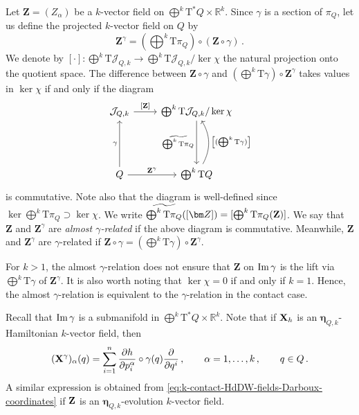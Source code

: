 \documentclass[11pt,twoside]{article}
\theoremstyle{plain}
\theoremstyle{definition}
\theoremstyle{remark}
\newcommand{\T}{\mathrm{T}}
\newcommand{\cT}{\mathrm{T}^\ast}
\begin{document}
Let $\mathbf{Z}=(Z_\alpha)$ be a $k$-vector field on
$\bigoplus^k \cT Q \times \mathbb{R}^k$. Since $\gamma$ is a section of $\pi_Q$, let us define the projected $k$-vector
field on $Q$ by
\[
\textstyle\mathbf{Z}^\gamma
=\left(\bigoplus\nolimits^k \T\pi_Q\right)\circ (\mathbf{Z}\circ \gamma)\,.
\]
We denote by $\left[\cdot\right]\colon\bigoplus^k\T\mathcal{J}_{Q,k}\to \bigoplus^k\T\mathcal{J}_{Q,k}/\ker \chi$ the natural projection onto the quotient space. 
The difference between \(
\mathbf{Z}\circ \gamma\) and \(
\left(\bigoplus\nolimits^k \T\gamma\right)\circ \mathbf{Z}^\gamma
\) takes values in $\ker \chi$ if and only if the diagram
\[
\begin{tikzcd}[row sep=4.5em]
\mathcal{J}_{Q,k}
  \arrow[r,"{[\mathbf{Z}]}"]
&
\bigoplus^k \T\mathcal{J}_{Q,k}/\ker \chi
  \arrow[d,"\widetilde{\bigoplus^k \T\pi_Q}"']
\\
Q
  \arrow[r,"\mathbf{Z}^\gamma"]
  \arrow[u,"\gamma"]
&
\bigoplus^k \T Q
  \arrow[u,bend right=30,"{\left[(\bigoplus^k \T\gamma)\right]}"']
\end{tikzcd}
\]
is  commutative. Note also that the diagram is well-defined since $\ker \bigoplus^k\T\pi_Q\supset \ker \chi$. We write $\widetilde{\bigoplus^k \T\pi_Q}([{\bm Z}])=[\bigoplus^k\T\pi_Q ({\bf Z})]$. We say that $\mathbf{Z}$ and $\mathbf{Z}^\gamma$ are {\it almost $\gamma$-related} if the above diagram is commutative. Meanwhile, $\mathbf{Z}$ and $\mathbf{Z}^\gamma$ are $\gamma$-related if  $\mathbf{Z}\circ \gamma = (\bigoplus^k\T \gamma)\circ {\bm Z}^\gamma$.

For $k>1$, the almost $\gamma$-relation does not ensure that $\mathbf{Z}$ on ${\rm Im}\,\gamma$ is the lift via $ \bigoplus^k\T\gamma$  of $\mathbf{Z}^\gamma$. It is also worth noting that $\ker \chi=0$ if and only if $k=1$. Hence,  the almost $\gamma$-relation is equivalent to the $\gamma$-relation in the contact case.

Recall that ${\rm Im}\, \gamma$ is a submanifold in $\bigoplus^k \cT Q \times \mathbb{R}^k$.   Note that if ${\bf X}_h$ is an $\bm\eta_{Q,k}$-Hamiltonian $k$-vector field, then 
\begin{equation}\label{eq:ProjZgamma}
({\bf X}^\gamma)_\alpha(q)=\sum_{i=1}^n\frac{\partial h}{\partial p^\alpha_i}\circ\gamma(q)\frac{\partial}{\partial q^i}\,,\qquad \alpha=1,\dotsc,k\,,\qquad q\in Q\,.
\end{equation}
A similar expression is obtained from \eqref{eq:k-contact-HdDW-fields-Darboux-coordinates} if ${\bf Z}$ is an $\bm \eta_{Q,k}$-evolution  $k$-vector field.
\end{document}
